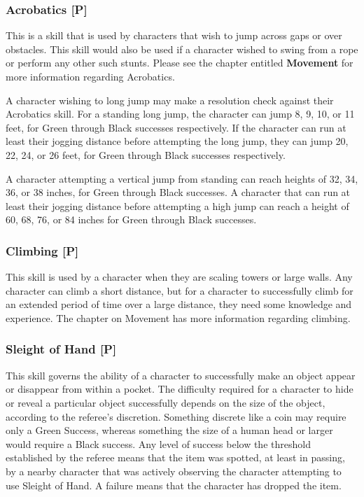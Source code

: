 \documentclass[oneside]{book}
\begin{document}
\begin{multicols}{2}
\subsubsection{Acrobatics [P]}
This is a skill that is used by characters that wish to jump across gaps or over obstacles. This skill would also be used if a character wished to swing from a rope or perform any other such stunts. Please see the chapter entitled \textbf{Movement} for more information regarding Acrobatics.

A character wishing to long jump may make a resolution check against their Acrobatics skill. For a standing long jump, the character can jump 8, 9, 10, or 11 feet, for Green through Black successes respectively.
If the character can run at least their jogging distance before attempting the long jump, they can jump 20, 22, 24, or 26 feet, for Green through Black successes respectively.

A character attempting a vertical jump from standing can reach heights of 32, 34, 36, or 38 inches, for Green through Black successes. A character that can run at least their jogging distance before attempting a high jump can reach a height of 60, 68, 76, or 84 inches for Green through Black successes.
\subsubsection{Climbing [P]}
This skill is used by a character when they are scaling towers or large walls. Any character can climb a short distance, but for a character to successfully climb for an extended period of time over a large distance, they need some knowledge and experience. The chapter on Movement has more information regarding climbing. 

\subsubsection{Sleight of Hand [P]}
This skill governs the ability of a character to successfully make an object appear or disappear from within a pocket. The difficulty required for a character to hide or reveal a particular object successfully depends on the size of the object, according to the referee's discretion. Something discrete like a coin may require only a Green Success, whereas something the size of a human head or larger would require a Black success. Any level of success below the threshold established by the referee means that the item was spotted, at least in passing, by a nearby character that was actively observing the character attempting to use Sleight of Hand. A failure means that the character has dropped the item. 


\end{multicols}
\end{document}

